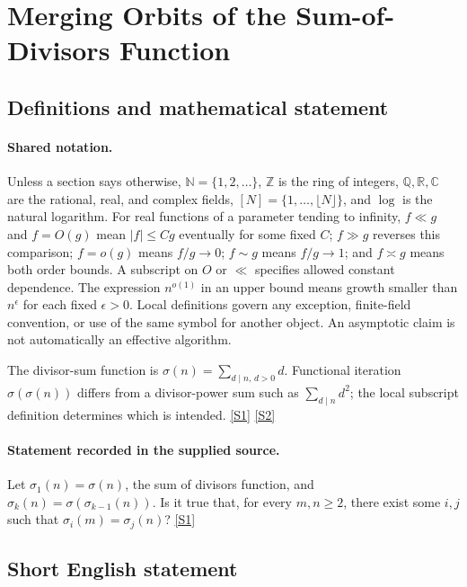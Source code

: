\documentclass[11pt,a4paper]{article}
\newcommand{\N}{\mathbb{N}}
\newcommand{\Z}{\mathbb{Z}}
\newcommand{\Q}{\mathbb{Q}}
\newcommand{\R}{\mathbb{R}}
\newcommand{\C}{\mathbb{C}}
\newcommand{\sref}[2]{\hyperlink{source:#1:#2}{[S#2]}}
\begin{document}
\section{Merging Orbits of the Sum-of-Divisors Function}\label{statement}


\subsection{Definitions and mathematical statement}

\paragraph{Shared notation.}Unless a section says otherwise, $\N=\{1,2,\ldots\}$,
$\Z$ is the ring of integers, $\Q,\R,\C$ are the rational, real, and complex
fields, $[N]=\{1,\ldots,\lfloor N\rfloor\}$, and $\log$ is the natural
logarithm. For real functions of a parameter tending to infinity,
$f\ll g$ and $f=O(g)$ mean $|f|\leq Cg$ eventually for some fixed $C$;
$f\gg g$ reverses this comparison; $f=o(g)$ means $f/g\to0$;
$f\sim g$ means $f/g\to1$; and $f\asymp g$ means both order bounds.
A subscript on $O$ or $\ll$ specifies allowed constant dependence.
The expression $n^{o(1)}$ in an upper bound means growth smaller than
$n^\epsilon$ for each fixed $\epsilon>0$. Local definitions govern any
exception, finite-field convention, or use of the same symbol for another
object. An asymptotic claim is not automatically an effective algorithm.



The divisor-sum function is $\sigma(n)=\sum_{d\mid n,\,d>0}d$. Functional iteration $\sigma(\sigma(n))$ differs from a divisor-power sum such as $\sum_{d\mid n}d^2$; the local subscript definition determines which is intended. \sref{statement}{1} \sref{statement}{2}

\paragraph{Statement recorded in the supplied source.}
Let $\sigma_1(n)=\sigma(n)$, the sum of divisors function, and $\sigma_k(n)=\sigma(\sigma_{k-1}(n))$.
Is it true that, for every $m,n\geq 2$, there exist some $i,j$ such that $\sigma_i(m)=\sigma_j(n)$? \sref{statement}{1}

\subsection{Short English statement}
\end{document}

